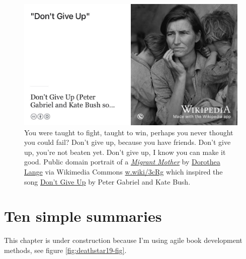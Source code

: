 \documentclass[
]{book}
\begin{document}
\begin{figure}

{\centering \includegraphics[width=1\linewidth]{images/dont-give-up-bush-gabriel} 

}

\caption{You were taught to fight, taught to win, perhaps you never thought you could fail? Don't give up, because you have friends. Don't give up, you're not beaten yet. Don't give up, I know you can make it good. \citep{dontgiveup} Public domain portrait of a \emph{\href{https://en.wikipedia.org/wiki/Migrant_Mother}{Migrant Mother}} by \href{https://en.wikipedia.org/wiki/Dorothea_Lange}{Dorothea Lange} via Wikimedia Commons \href{https://w.wiki/3cRg}{w.wiki/3cRg} which inspired the song \href{https://en.wikipedia.org/wiki/Don't_Give_Up_(Peter_Gabriel_and_Kate_Bush_song)}{Don't Give Up} by Peter Gabriel and Kate Bush. \citep{dontgiveup}}\label{fig:katebush-fig}
\end{figure}



\hypertarget{tldr13}{%
\section{Ten simple summaries}\label{tldr13}}

This chapter is under construction because I'm using agile book development methods, see figure \ref{fig:deathstar19-fig}.
\end{document}
